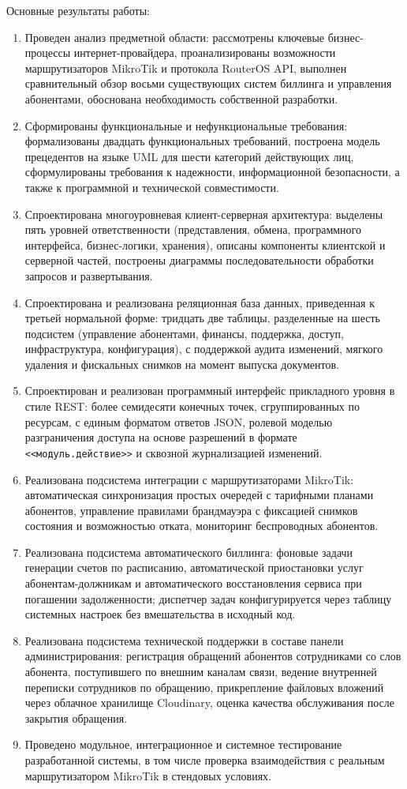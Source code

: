 Основные результаты работы:
\begin{enumerate}
\item Проведен анализ предметной области: рассмотрены ключевые бизнес-процессы интернет-провайдера, проанализированы возможности маршрутизаторов MikroTik и протокола RouterOS API, выполнен сравнительный обзор восьми существующих систем биллинга и управления абонентами, обоснована необходимость собственной разработки.
\item Сформированы функциональные и нефункциональные требования: формализованы двадцать функциональных требований, построена модель прецедентов на языке UML для шести категорий действующих лиц, сформулированы требования к надежности, информационной безопасности, а также к программной и технической совместимости.
\item Спроектирована многоуровневая клиент-серверная архитектура: выделены пять уровней ответственности (представления, обмена, программного интерфейса, бизнес-логики, хранения), описаны компоненты клиентской и серверной частей, построены диаграммы последовательности обработки запросов и развертывания.
\item Спроектирована и реализована реляционная база данных, приведенная к третьей нормальной форме: тридцать две таблицы, разделенные на шесть подсистем (управление абонентами, финансы, поддержка, доступ, инфраструктура, конфигурация), с поддержкой аудита изменений, мягкого удаления и фискальных снимков на момент выпуска документов.
\item Спроектирован и реализован программный интерфейс прикладного уровня в стиле REST: более семидесяти конечных точек, сгруппированных по ресурсам, с единым форматом ответов JSON, ролевой моделью разграничения доступа на основе разрешений в формате \texttt{<<модуль.действие>>} и сквозной журнализацией изменений.
\item Реализована подсистема интеграции с маршрутизаторами MikroTik: автоматическая синхронизация простых очередей с тарифными планами абонентов, управление правилами брандмауэра с фиксацией снимков состояния и возможностью отката, мониторинг беспроводных абонентов.
\item Реализована подсистема автоматического биллинга: фоновые задачи генерации счетов по расписанию, автоматической приостановки услуг абонентам-должникам и автоматического восстановления сервиса при погашении задолженности; диспетчер задач конфигурируется через таблицу системных настроек без вмешательства в исходный код.
\item Реализована подсистема технической поддержки в составе панели администрирования: регистрация обращений абонентов сотрудниками со слов абонента, поступившего по внешним каналам связи, ведение внутренней переписки сотрудников по обращению, прикрепление файловых вложений через облачное хранилище Cloudinary, оценка качества обслуживания после закрытия обращения.
\item Проведено модульное, интеграционное и системное тестирование разработанной системы, в том числе проверка взаимодействия с реальным маршрутизатором MikroTik в стендовых условиях.
\end{enumerate}


